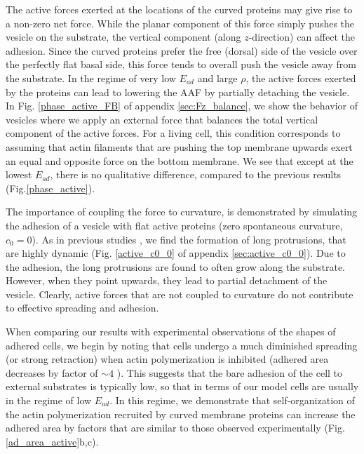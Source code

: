 \documentclass[pre,amsmath]{revtex4}
\begin{document}
The active forces exerted at the locations of the curved proteins may give rise to a non-zero net force. While the planar component of this force simply pushes the vesicle on the substrate, the vertical component (along $z$-direction) can affect the adhesion. Since the curved proteins prefer the free (dorsal) side of the vesicle over the perfectly flat basal side, this force tends to overall push the vesicle away from the substrate.
In the regime of very low $E_{ad}$ and large $\rho$, the active forces exerted by the proteins can lead to lowering the AAF by partially detaching the vesicle. In Fig. \ref{phase_active_FB} of appendix \ref{sec:Fz_balance}, we show the behavior of vesicles where we apply an external force that balances the total vertical component of the active forces. For a living cell, this condition corresponds to assuming that actin filaments that are pushing the top membrane upwards exert an equal and opposite force on the bottom membrane. We see that except at the lowest $E_{ad}$, there is no qualitative difference, compared to the previous results (Fig.\ref{phase_active}).

The importance of coupling the force to curvature, is demonstrated by simulating the adhesion of a vesicle with flat active proteins (zero spontaneous curvature, $c_0=0$). As in previous studies \cite{miha2019,graziano2019cell}, we find the formation of long protrusions, that are highly dynamic (Fig. \ref{active_c0_0} of appendix \ref{sec:active_c0_0}). Due to the adhesion, the long protrusions are found to often grow along the substrate. However, when they point upwards, they lead to partial detachment of the vesicle. Clearly, active forces that are not coupled to curvature do not contribute to effective spreading and adhesion.

When comparing our results with experimental observations of the shapes of adhered cells, we begin by noting that cells undergo a much diminished spreading (or strong retraction) when actin polymerization is inhibited (adhered area decreases by factor of $\sim4$ \cite{Sheetz2008}). This suggests that the bare adhesion of the cell to external substrates is typically low, so that in terms of our model cells are usually in the regime of low $E_{ad}$. In this regime, we demonstrate that self-organization of the actin polymerization recruited by curved membrane proteins can increase the adhered area by factors that are similar to those observed experimentally (Fig.\ref{ad_area_active}b,c). 
\end{document}
